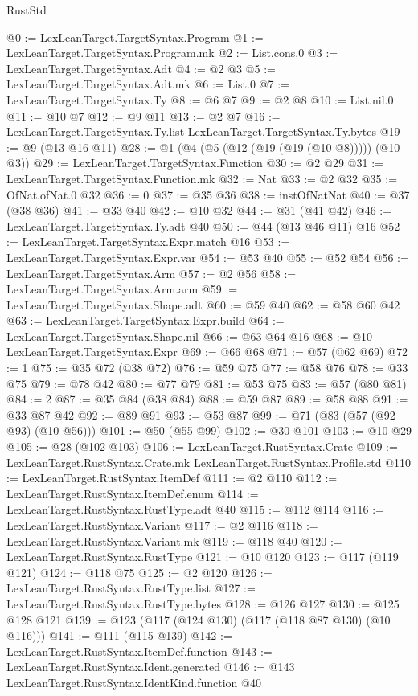\begin{lexlean}{RustStd}
\begin{coremodule}
@0 := LexLeanTarget.TargetSyntax.Program
@1 := LexLeanTarget.TargetSyntax.Program.mk
@2 := List.cons.{0}
@3 := LexLeanTarget.TargetSyntax.Adt
@4 := @2 @3
@5 := LexLeanTarget.TargetSyntax.Adt.mk
@6 := List.{0}
@7 := LexLeanTarget.TargetSyntax.Ty
@8 := @6 @7
@9 := @2 @8
@10 := List.nil.{0}
@11 := @10 @7
@12 := @9 @11
@13 := @2 @7
@16 := LexLeanTarget.TargetSyntax.Ty.list LexLeanTarget.TargetSyntax.Ty.bytes
@19 := @9 (@13 @16 @11)
@28 := @1 (@4 (@5 (@12 (@19 (@19 (@10 @8))))) (@10 @3))
@29 := LexLeanTarget.TargetSyntax.Function
@30 := @2 @29
@31 := LexLeanTarget.TargetSyntax.Function.mk
@32 := Nat
@33 := @2 @32
@35 := OfNat.ofNat.{0} @32
@36 := 0
@37 := @35 @36
@38 := instOfNatNat
@40 := @37 (@38 @36)
@41 := @33 @40
@42 := @10 @32
@44 := @31 (@41 @42)
@46 := LexLeanTarget.TargetSyntax.Ty.adt @40
@50 := @44 (@13 @46 @11) @16
@52 := LexLeanTarget.TargetSyntax.Expr.match @16
@53 := LexLeanTarget.TargetSyntax.Expr.var
@54 := @53 @40
@55 := @52 @54
@56 := LexLeanTarget.TargetSyntax.Arm
@57 := @2 @56
@58 := LexLeanTarget.TargetSyntax.Arm.arm
@59 := LexLeanTarget.TargetSyntax.Shape.adt
@60 := @59 @40
@62 := @58 @60 @42
@63 := LexLeanTarget.TargetSyntax.Expr.build
@64 := LexLeanTarget.TargetSyntax.Shape.nil
@66 := @63 @64 @16
@68 := @10 LexLeanTarget.TargetSyntax.Expr
@69 := @66 @68
@71 := @57 (@62 @69)
@72 := 1
@75 := @35 @72 (@38 @72)
@76 := @59 @75
@77 := @58 @76
@78 := @33 @75
@79 := @78 @42
@80 := @77 @79
@81 := @53 @75
@83 := @57 (@80 @81)
@84 := 2
@87 := @35 @84 (@38 @84)
@88 := @59 @87
@89 := @58 @88
@91 := @33 @87 @42
@92 := @89 @91
@93 := @53 @87
@99 := @71 (@83 (@57 (@92 @93) (@10 @56)))
@101 := @50 (@55 @99)
@102 := @30 @101
@103 := @10 @29
@105 := @28 (@102 @103)
@106 := LexLeanTarget.RustSyntax.Crate
@109 := LexLeanTarget.RustSyntax.Crate.mk LexLeanTarget.RustSyntax.Profile.std
@110 := LexLeanTarget.RustSyntax.ItemDef
@111 := @2 @110
@112 := LexLeanTarget.RustSyntax.ItemDef.enum
@114 := LexLeanTarget.RustSyntax.RustType.adt @40
@115 := @112 @114
@116 := LexLeanTarget.RustSyntax.Variant
@117 := @2 @116
@118 := LexLeanTarget.RustSyntax.Variant.mk
@119 := @118 @40
@120 := LexLeanTarget.RustSyntax.RustType
@121 := @10 @120
@123 := @117 (@119 @121)
@124 := @118 @75
@125 := @2 @120
@126 := LexLeanTarget.RustSyntax.RustType.list
@127 := LexLeanTarget.RustSyntax.RustType.bytes
@128 := @126 @127
@130 := @125 @128 @121
@139 := @123 (@117 (@124 @130) (@117 (@118 @87 @130) (@10 @116)))
@141 := @111 (@115 @139)
@142 := LexLeanTarget.RustSyntax.ItemDef.function
@143 := LexLeanTarget.RustSyntax.Ident.generated
@146 := @143 LexLeanTarget.RustSyntax.IdentKind.function @40

\end{coremodule}
\end{lexlean}
